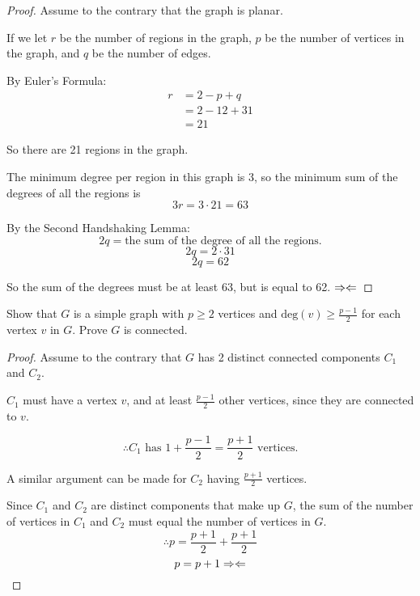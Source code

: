 \documentclass[12pt]{article}
\begin{document}
\begin{proof}
Assume to the contrary that the graph is planar.

If we let $r$ be the number of regions in the graph, $p$ be the number of vertices in the graph, and $q$ be the number of edges.

By Euler's Formula:
\begin{align*}
r &= 2 - p + q\\
&= 2 - 12 + 31\\
&= 21
\end{align*}

So there are 21 regions in the graph.

The minimum degree per region in this graph is 3, so the minimum sum of the degrees of all the regions is
$$3r = 3 \cdot 21 = 63$$

By the Second Handshaking Lemma:
$$2q = \text{the sum of the degree of all the regions.}$$
$$2q = 2 \cdot 31$$
$$2q = 62$$

So the sum of the degrees must be at least 63, but is equal to 62. $\Rightarrow\Leftarrow$

\end{proof}
\newpage
\begin{flushleft}
Show that $G$ is a simple graph with $p \geq 2$ vertices and $\text{deg}(v)\geq\frac{p - 1}{2}$ for each vertex $v$ in $G$. Prove $G$ is connected.
\end{flushleft}

\begin{proof}
Assume to the contrary that $G$ has 2 distinct connected components $C_1$ and $C_2$.

$C_1$ must have a vertex $v$, and at least $\frac{p-1}{2}$ other vertices, since they are connected to $v$. 

$$\therefore C_1 \text{ has } 1 + \frac{p-1}{2} = \frac{p+1}{2} \text{ vertices.}$$

A similar argument can be made for $C_2$ having $\frac{p+1}{2}$ vertices.

Since $C_1$ and $C_2$ are distinct components that make up $G$, the sum of the number of vertices in $C_1$ and $C_2$ must equal the number of vertices in $G$.
$$\therefore p = \frac{p+1}{2} + \frac{p + 1}{2}$$
$$p = p + 1 \Rightarrow\Leftarrow$$

\end{proof}
\end{document}
